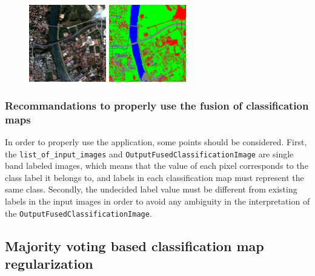\begin{figure}[!h]
  \center
  \includegraphics[width=0.3\textwidth]{../Art/MonteverdiImages/classification_chain_inputimage.jpg}
  \includegraphics[width=0.3\textwidth]{../Art/MonteverdiImages/QB_1_ortho_DS_V_P_C123456_CM.png}
  \label{fig:ClassificationMapFusionApplicationDS}
\end{figure}
 

\subsubsection{Recommandations to properly use the fusion of classification maps}

In order to properly use the  application, 
some points should be considered. First, the \verb?list_of_input_images? and 
\verb?OutputFusedClassificationImage? are single band labeled images, which means 
that the value of each pixel corresponds to the class label it belongs to, and 
labels in each classification map must represent the same class. Secondly, the 
undecided label value must be different from existing labels in the input images in 
order to avoid any ambiguity in the interpretation of the \verb?OutputFusedClassificationImage?.





\subsection{Majority voting based classification map regularization}\label{ssec:classificationmapregularization}

